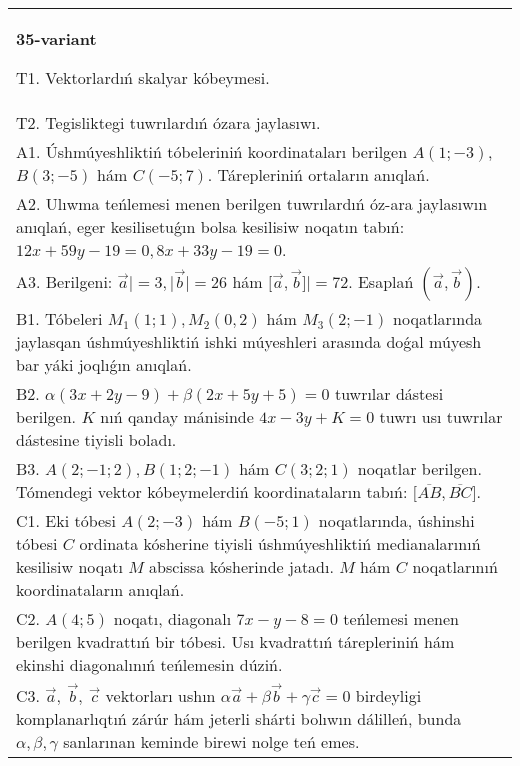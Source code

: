 \documentclass{article}
\begin{document}
\begin{tabular}{m{17cm}}
\textbf{35-variant}
\newline

T1. 
Vektorlardıń skalyar kóbeymesi.
 \\
T2. 
Tegisliktegi tuwrılardıń ózara jaylasıwı.
 \\
A1. 
Úshmúyeshliktiń tóbeleriniń koordinataları berilgen
$A(1;-3)$, $B(3;-5)$ hám $C(-5;7)$. Tárepleriniń ortaların
anıqlań.
 \\
A2. 
Ulıwma teńlemesi menen berilgen tuwrılardıń      
óz-ara jaylasıwın anıqlań, eger kesilisetuǵın bolsa kesilisiw noqatın 
tabıń: $12x+59y-19=0, 8x+33y-19=0$.
 \\
A3. 
Berilgeni: $\overrightarrow{a}| = 3,|\overrightarrow{b}| = 26$ hám
$\lbrack\overrightarrow{a},\overrightarrow{b}\rbrack| = 72$. Esaplań
$\left(\overrightarrow{a},\overrightarrow{b} \right) $.
 \\
B1. 
Tóbeleri \(M_{1}(1;1), M_{2}(0,2)\) hám
\(M_{3}(2;-1)\) noqatlarında jaylasqan úshmúyeshliktiń ishki
múyeshleri arasında doǵal múyesh bar yáki joqlıǵın anıqlań.
 \\
B2. 
\(\alpha(3x+2y-9)+\beta(2x+5y+5)=0\)
tuwrılar dástesi berilgen. $K$ nıń qanday mánisinde
\(4x-3y+K=0\) tuwrı usı tuwrılar dástesine tiyisli boladı.
 \\
B3. 
$A (2; -1;2),B (1;2; - 1) $ hám $C (3;2;1) $ noqatlar berilgen. Tómendegi vektor kóbeymelerdiń koordinataların tabıń: 
$\lbrack\overline{AB},\overline{BC}\rbrack$.
 \\
C1. 
Eki tóbesi \(A(2; - 3)\) hám \(B( - 5;1)\) noqatlarında,
úshinshi tóbesi $C$ ordinata kósherine tiyisli úshmúyeshliktiń
medianalarınıń kesilisiw noqatı $M$ abscissa kósherinde jatadı.
$M$ hám $C$ noqatlarınıń koordinataların anıqlań.
 \\
C2. 
\(A(4;5)\) noqatı, diagonalı \(7x - y - 8 = 0\) teńlemesi
menen berilgen kvadrattıń bir tóbesi. Usı kvadrattıń tárepleriniń hám
ekinshi diagonalınıń teńlemesin dúziń.
 \\
C3. 
\(\vec{a},\ \vec{b},\ \vec{c}\) vektorları ushın \(\alpha\vec{a} + \beta\vec{b} + \gamma\vec{c} = 0\) birdeyligi komplanarlıqtıń zárúr hám jeterli shárti bolıwın dálilleń, bunda \(\alpha,\beta,\gamma\) sanlarınan keminde birewi nolge teń emes. \\

\end{tabular}
\vspace{1cm}
\end{document}
